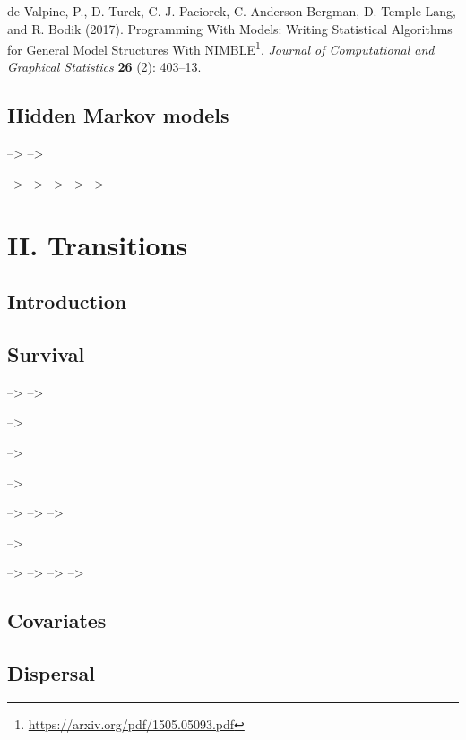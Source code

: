 \documentclass[
  12pt,
]{krantz}
\renewenvironment{quote}{\begin{VF}}{\end{VF}}
\renewcommand{\href}[2]{#2\footnote{\url{#1}}}
\begin{document}
\begin{quote}
de Valpine, P., D. Turek, C. J. Paciorek, C. Anderson-Bergman, D. Temple Lang, and R. Bodik (2017). \href{https://arxiv.org/pdf/1505.05093.pdf}{Programming With Models: Writing Statistical Algorithms for General Model Structures With NIMBLE}. \emph{Journal of Computational and Graphical Statistics} \textbf{26} (2): 403--13.
\end{quote}

\hypertarget{hmmcapturerecapture}{%
\chapter{Hidden Markov models}\label{hmmcapturerecapture}}

--\textgreater{}
--\textgreater{}

--\textgreater{}
--\textgreater{}
--\textgreater{}
--\textgreater{}
--\textgreater{}

\hypertarget{part-ii.-transitions}{%
\part{II. Transitions}\label{part-ii.-transitions}}

\hypertarget{introduction-3}{%
\chapter*{Introduction}\label{introduction-3}}


\hypertarget{survival}{%
\chapter{Survival}\label{survival}}

--\textgreater{}
--\textgreater{}

--\textgreater{}

--\textgreater{}

--\textgreater{}

--\textgreater{}
--\textgreater{}
--\textgreater{}

--\textgreater{}

--\textgreater{}
--\textgreater{}
--\textgreater{}
--\textgreater{}

\hypertarget{covariates}{%
\chapter{Covariates}\label{covariates}}

\hypertarget{dispersal}{%
\chapter{Dispersal}\label{dispersal}}
\end{document}
